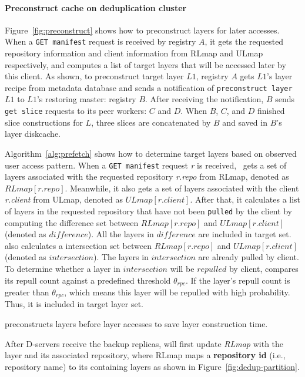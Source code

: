 \paragraph{Preconstruct cache on deduplication cluster}


Figure~\ref{fig:preconstruct}
shows how to preconstruct layers for later accesses.
When a \texttt{GET manifest} request is received by registry $A$,
it gets the requested repository information and client information from RLmap and ULmap respectively, 
and computes a list of target layers that will be accessed later by this client.
As shown, to preconstruct target layer $L1$, 
registry $A$ gets $L1$'s layer recipe from metadata database
and sends a notification of \texttt{preconstruct layer} $L1$ to 
$L1$'s restoring master: registry $B$. 
After receiving the notification, 
$B$ sends \texttt{get slice} requests to its peer workers: $C$ and $D$.
When $B$, $C$, and $D$ finished slice constructions for $L$,
three slices are concatenated by $B$ and saved in $B$'s layer diskcache. 

Algorithm~\ref{alg:prefetch} shows how to determine target layers 
based on observed user access pattern.
When a \texttt{GET manifest} request \emph{r} is received,
\sysname~gets a set of layers associated with the requested repository \emph{r.repo} from RLmap, 
denoted as $RLmap[r.repo]$.
Meanwhile, it also gets a set of layers associated with the client \emph{r.client} from ULmap,
denoted as $ULmap[r.client]$.
After that, it calculates a list of layers in the requested repository 
that have not been \texttt{pulled} by the client by
computing the difference set between $RLmap[r.repo]$ and $ULmap[r.client]$ (denoted as $difference$).
All the layers in $difference$ are included in target set.
\sysname also calculates a intersection set between 
$RLmap[r.repo]$ and $ULmap[r.client]$ (denoted as $intersection$).
The layers in $intersection$ are already pulled by client.
To determine whether a layer in $intersection$ will be
$repulled$ by client,
\sysname compares its repull count against a predefined threshold $\theta_{rpc}$.
If the layer's repull count is greater than $\theta_{rpc}$,
which means this layer will be repulled with high probability.
Thus, it is included in target layer set.

\sysname preconstructs layers before layer accesses to save layer construction time.

After D-servers receive the backup replicas,
\sysname will first update \emph{RLmap} with the layer and its associated repository, where
RLmap maps a \textbf{repository id} (i.e., repository name) to its containing layers 
as shown in Figure~\ref{fig:dedup-partition}.

